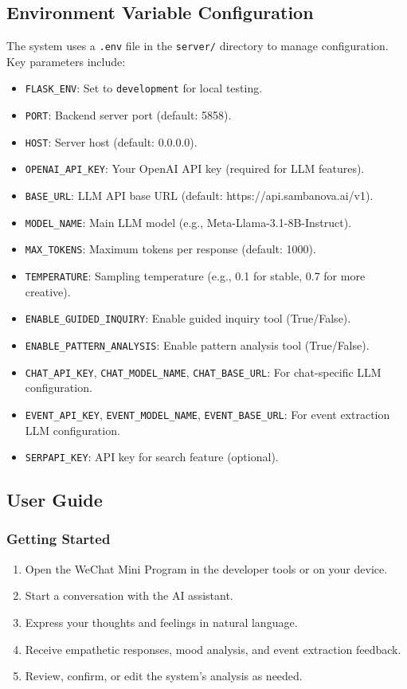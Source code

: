 \subsection{Environment Variable Configuration}

The system uses a \texttt{.env} file in the \texttt{server/} directory to manage configuration. Key parameters include:

\begin{itemize}
    \item \texttt{FLASK_ENV}: Set to \texttt{development} for local testing.
    \item \texttt{PORT}: Backend server port (default: 5858).
    \item \texttt{HOST}: Server host (default: 0.0.0.0).
    \item \texttt{OPENAI_API_KEY}: Your OpenAI API key (required for LLM features).
    \item \texttt{BASE_URL}: LLM API base URL (default: https://api.sambanova.ai/v1).
    \item \texttt{MODEL_NAME}: Main LLM model (e.g., Meta-Llama-3.1-8B-Instruct).
    \item \texttt{MAX_TOKENS}: Maximum tokens per response (default: 1000).
    \item \texttt{TEMPERATURE}: Sampling temperature (e.g., 0.1 for stable, 0.7 for more creative).
    \item \texttt{ENABLE_GUIDED_INQUIRY}: Enable guided inquiry tool (True/False).
    \item \texttt{ENABLE_PATTERN_ANALYSIS}: Enable pattern analysis tool (True/False).
    \item \texttt{CHAT_API_KEY}, \texttt{CHAT_MODEL_NAME}, \texttt{CHAT_BASE_URL}: For chat-specific LLM configuration.
    \item \texttt{EVENT_API_KEY}, \texttt{EVENT_MODEL_NAME}, \texttt{EVENT_BASE_URL}: For event extraction LLM configuration.
    \item \texttt{SERPAPI_KEY}: API key for search feature (optional).
\end{itemize}

\subsection{User Guide}

\subsubsection{Getting Started}
\begin{enumerate}
    \item Open the WeChat Mini Program in the developer tools or on your device.
    \item Start a conversation with the AI assistant.
    \item Express your thoughts and feelings in natural language.
    \item Receive empathetic responses, mood analysis, and event extraction feedback.
    \item Review, confirm, or edit the system's analysis as needed.
\end{enumerate}

